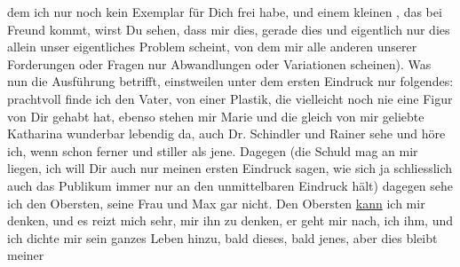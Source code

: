               dem ich nur noch kein Exemplar für Dich frei habe, und einem kleinen \label{K_L01548-3v}\label{K_L01548-3}, das bei Freund kommt,
               wirst \label{LL294-2v}Du sehen, dass mir dies, gerade dies und
                  eigentlich nur dies allein unser eigentliches Problem scheint, von dem mir alle
                  anderen unserer Forderungen oder Fragen nur Abwandlungen oder Variationen
                  scheinen\label{LL294-2h}). Was nun die Ausführung betrifft, einstweilen unter {\pb}dem ersten Eindruck nur folgendes: prachtvoll finde ich den Vater, von einer
               Plastik, die vielleicht noch nie eine Figur von Dir gehabt hat, ebenso stehen mir
               Marie und die gleich von mir geliebte Katharina wunderbar lebendig da, auch Dr.
               Schindler und Rainer sehe und höre ich, wenn schon ferner und stiller als jene.
               Dagegen (die Schuld mag an mir liegen, ich will Dir auch nur meinen ersten Eindruck
               sagen, wie sich ja schliesslich auch das Publikum immer nur an den unmittelbaren
               Eindruck hält) dagegen sehe ich den Obersten, seine Frau und Max gar nicht. Den Obersten \uline{kann} ich mir
               denken, und es reizt mich sehr, mir ihn zu denken, er geht mir nach, ich ihm, und ich
               dichte mir sein ganzes Leben hinzu, bald dieses, bald jenes, aber dies bleibt meiner
